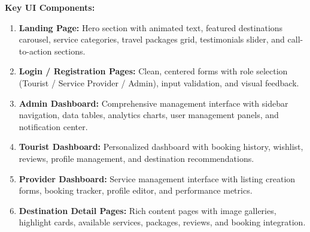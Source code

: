 \textbf{Key UI Components:}
\begin{enumerate}[leftmargin=2em]
    \item \textbf{Landing Page:} Hero section with animated text, featured destinations carousel, service categories, travel packages grid, testimonials slider, and call-to-action sections.
    \item \textbf{Login / Registration Pages:} Clean, centered forms with role selection (Tourist / Service Provider / Admin), input validation, and visual feedback.
    \item \textbf{Admin Dashboard:} Comprehensive management interface with sidebar navigation, data tables, analytics charts, user management panels, and notification center.
    \item \textbf{Tourist Dashboard:} Personalized dashboard with booking history, wishlist, reviews, profile management, and destination recommendations.
    \item \textbf{Provider Dashboard:} Service management interface with listing creation forms, booking tracker, profile editor, and performance metrics.
    \item \textbf{Destination Detail Pages:} Rich content pages with image galleries, highlight cards, available services, packages, reviews, and booking integration.
\end{enumerate}

%
